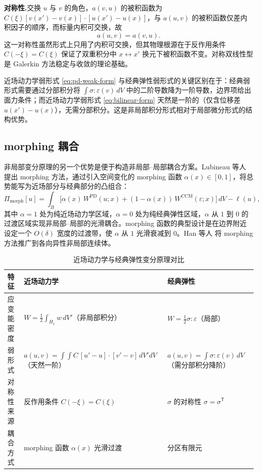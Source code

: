 \textbf{对称性.}\quad 交换 $u$ 与 $v$ 的角色，$a(v,u)$ 的被积函数为 $C(\xi)[v(x')-v(x)]\cdot[u(x')-u(x)]$，与 $a(u,v)$ 的被积函数仅差内积因子的顺序，而标量内积可交换，故
\begin{equation}
\label{eq:bilinear-symmetry}
a(u,v) = a(v,u).
\end{equation}
这一对称性虽然形式上只用了内积可交换，但其物理根源在于反作用条件 $C(-\xi)=C(\xi)$ 保证了双重积分中 $x\leftrightarrow x'$ 换元下被积函数不变。对称双线性型是 Galerkin 方法稳定与收敛的理论基础。

\begin{remark}
近场动力学弱形式 \eqref{eq:pd-weak-form} 与经典弹性弱形式的关键区别在于：经典弱形式需要通过分部积分将 $\int\sigma:\varepsilon(v)\,dV$ 中的二阶导数降为一阶导数，边界项给出面力条件；而近场动力学弱形式 \eqref{eq:bilinear-form} 天然是一阶的（仅含位移差 $u(x')-u(x)$），无需分部积分。这是非局部积分形式相对于局部微分形式的结构优势。
\end{remark}

\subsection{morphing 耦合}
\label{subsec:morphing}

非局部变分原理的另一个优势是便于构造非局部--局部耦合方案。Lubineau 等人 \cite{Lubineau2012} 提出 morphing 方法，通过引入空间变化的 morphing 函数 $\alpha(x)\in[0,1]$，将总势能写为近场部分与经典部分的凸组合：
\begin{equation}
\label{eq:morphing-potential}
\Pi_{\mathrm{morph}}[u] = \int_B\bigl[\alpha(x)\,W^{\mathrm{PD}}(u;x) + (1-\alpha(x))\,W^{\mathrm{CCM}}(\varepsilon;x)\bigr]\,dV - \ell(u),
\end{equation}
其中 $\alpha=1$ 处为纯近场动力学区域，$\alpha=0$ 处为纯经典弹性区域，$\alpha$ 从 $1$ 到 $0$ 的过渡区域实现非局部--局部的光滑耦合。morphing 函数的典型设计是在边界附近设定一个 $O(\delta)$ 宽度的过渡带，使 $\alpha$ 从 $1$ 光滑衰减到 $0$。Han 等人 \cite{Han2016morphing} 将 morphing 方法推广到各向异性非局部连续体。

\begin{table}[htbp]
\centering
\small
\caption{近场动力学与经典弹性变分原理对比}
\label{tab:variational-compare}
\begin{tabular}{>{\raggedright\arraybackslash}p{}>{\raggedright\arraybackslash}p{}>{\raggedright\arraybackslash}p{}}
\toprule
特征 & 近场动力学 & 经典弹性 \\
\midrule
应变能密度 & $W=\tfrac{1}{2}\int_{H_x}w\,dV'$（非局部积分） & $W=\tfrac{1}{2}\sigma:\varepsilon$（局部） \\
弱形式 & $a(u,v)=\int\int C\,[u'-u]\cdot[v'-v]\,dV'dV$（天然一阶） & $a(u,v)=\int\sigma:\varepsilon(v)\,dV$（需分部积分降阶） \\
对称性来源 & 反作用条件 $C(-\xi)=C(\xi)$ & $\sigma$ 的对称性 $\sigma=\sigma^{\mathsf{T}}$ \\
耦合方式 & morphing 函数 $\alpha(x)$ 光滑过渡 & 分区有限元 \\
\bottomrule
\end{tabular}
\end{table}

